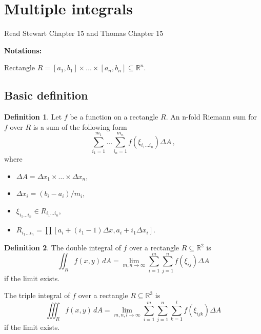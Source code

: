 \documentclass[
]{article}
\theoremstyle{definition}
\newtheorem{definition}{Definition}[section]
\theoremstyle{definition}
\theoremstyle{definition}
\theoremstyle{definition}
\theoremstyle{remark}
\begin{document}
\newpage

\hypertarget{multiple-integrals}{%
\section{Multiple integrals}\label{multiple-integrals}}

Read Stewart Chapter 15 and Thomas Chapter 15

\textbf{Notations:}

Rectangle \(R= [a_1,b_1]\times \dots \times [a_n, b_n] \subseteq \mathbb{R}^n\).

\hypertarget{basic-definition}{%
\subsection{Basic definition}\label{basic-definition}}

\begin{definition}

Let \(f\) be a function on a rectangle \(R\).
An n-fold Riemann sum for \(f\) over \(R\) is a sum of the following form
\begin{equation*}
 \sum_{i_1=1}^{m_1}\dots \sum_{i_n=1}^{m_n} f(\xi_{i_1\dots i_n}) \Delta A \,,
\end{equation*}
where

\begin{itemize}
\item
  \(\Delta A = \Delta x_1\times\dots \times \Delta x_n\),
\item
  \(\Delta x_i = (b_i-a_i)/m_i\),
\item
  \(\xi_{i_1\dots i_n}\in R_{i_1\dots i_n}\),
\item
  \(R_{i_1\dots i_n}= \prod [a_i + (i_1-1)\Delta x, a_i+ i_1\Delta x_i]\).
\end{itemize}

\end{definition}

\begin{definition}
The double integral of \(f\) over a rectangle \(R \subseteq \mathbb{R}^2\) is
\begin{equation*}
    \iint_{R} f(x,y) \, dA = \lim_{m,n\to \infty} \sum_{i=1}^m \sum_{j=1}^n f(\xi_{ij}) \Delta A 
\end{equation*}
if the limit exists.

The triple integral of \(f\) over a rectangle \(R \subseteq \mathbb{R}^3\) is
\begin{equation*}
    \iiint_{R} f(x,y) \, dA = \lim_{m,n,l\to \infty} \sum_{i=1}^m \sum_{j=1}^n \sum_{k=1}^l f(\xi_{ijk}) \Delta A 
\end{equation*}
if the limit exists.
\end{definition}
\end{document}
